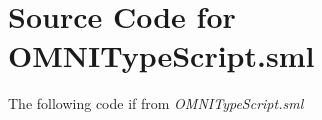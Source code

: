 

\chapter{Source Code for OMNITypeScript.sml}
\label{cha:source-code-omnityp}
The following code if from \emph{OMNITypeScript.sml}


